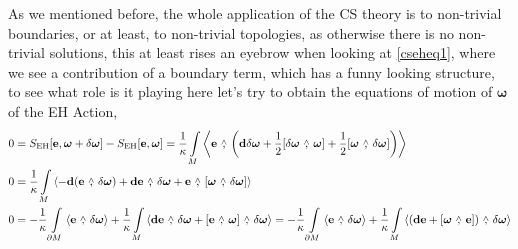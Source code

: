 As we mentioned before, the whole application of the CS theory is to non-trivial boundaries, or at least, to non-trivial 
topologies, as otherwise there is no non-trivial solutions, this at least rises an eyebrow when looking at \ref{cseheq1}, where we see a 
contribution of a boundary term, which has a funny looking structure, to see what role is it playing here let's try to obtain the equations of motion 
of $\boldsymbol\omega$ of the EH Action,
\begin{align*}
    0&=S_{\textnormal{EH}}\qty[\vb e,\boldsymbol\omega+\delta\boldsymbol\omega]-S_{\textnormal{EH}}\qty[\vb e,\boldsymbol\omega]=\frac1\kappa\int\limits_M\expval{\vb e\ \wedgecomma\ \qty(\vb d\delta\boldsymbol\omega+\frac12\wedgecomm{\delta\boldsymbol\omega}{\boldsymbol\omega}+\frac12\wedgecomm{\boldsymbol\omega}{\delta\boldsymbol\omega})}\\
    0&=\frac1\kappa\int\limits_M\expval{-\vb d\qty(\vb e\ \wedgecomma\ \delta\boldsymbol\omega)+\vb d\vb e\ \wedgecomma\ \delta\boldsymbol\omega+\vb e\ \wedgecomma\ \wedgecomm{\boldsymbol\omega}{\delta\boldsymbol\omega}}\\
    0&=-\frac1\kappa\int\limits_{\partial M}\expval{\vb e\ \wedgecomma\ \delta\boldsymbol\omega}+\frac1\kappa\int\limits_M\expval{\vb d\vb e\ \wedgecomma\ {\delta\boldsymbol\omega}+\wedgecomm{\vb e}{\boldsymbol\omega}\ \wedgecomma\ {\delta\boldsymbol\omega}}=-\frac1\kappa\int\limits_{\partial M}\expval{\vb e\ \wedgecomma\ \delta\boldsymbol\omega}+\frac1\kappa\int\limits_M\expval{\qty(\vb d\vb e+\wedgecomm{\boldsymbol\omega}{\vb e})\ \wedgecomma\ {\delta\boldsymbol\omega}}
\end{align*}


